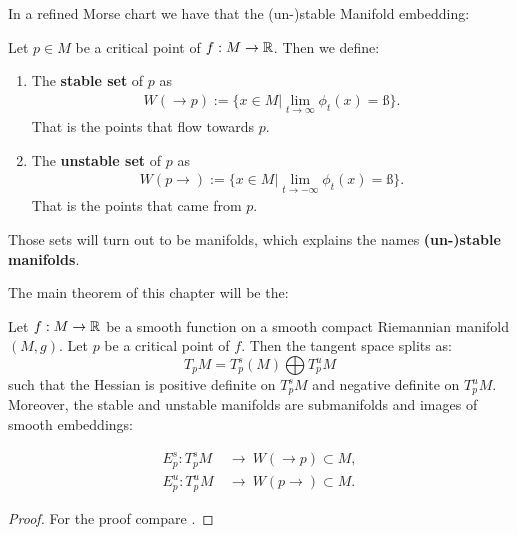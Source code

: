 In a refined Morse chart we have that the (un-)stable Manifold embedding: 
\begin{definition} 
	Let $p\in M$ be a critical point of $f:M\to \mathbb{R}$. Then we define:
	\begin{enumerate}
		\item The \textbf{stable set} of $p$ as 
		\begin{align*}
			W(\to p):=\{x\in M| \lim_{t\to \infty} \phi_t(x)=ß\}.
		\end{align*} That is the points that flow towards $p$.
		\item The \textbf{unstable set} of $p$ as 
		\begin{align*}
			W(p\to):=\{x\in M| \lim_{t\to -\infty} \phi_t(x)=ß\}.  
		\end{align*} That is the points that came from $p$. 
	\end{enumerate}
	Those sets will turn out to be manifolds, which explains the names \textbf{(un-)stable manifolds}.
\end{definition} 
The main theorem of this chapter will be the:
\begin{theorem} \label{thm: stable and unstable manifold theorem}
	Let $f:M\to \mathbb{R}$ be a smooth function on a smooth compact Riemannian manifold $(M,g)$. Let $p$ be a critical point of $f$. Then the tangent space splits as:
	\begin{equation*}
		T_pM=T^s_p(M) \bigoplus T^u_pM
	\end{equation*} such that the Hessian is positive definite on $T^s_pM$ and negative definite on $T^u_pM$. Moreover, the stable and unstable manifolds are submanifolds and images of smooth embeddings: 
	
	\begin{align*}
		E^s_p:T^s_pM ~ &\to ~  W(\to p) \subset M, \\
		E^u_p:T^u_pM~&\to~     W(p \to) \subset M.
	\end{align*}
\end{theorem}
\begin{proof}
	For the proof compare \cite{banyaga2004lectures}. 
\end{proof}

